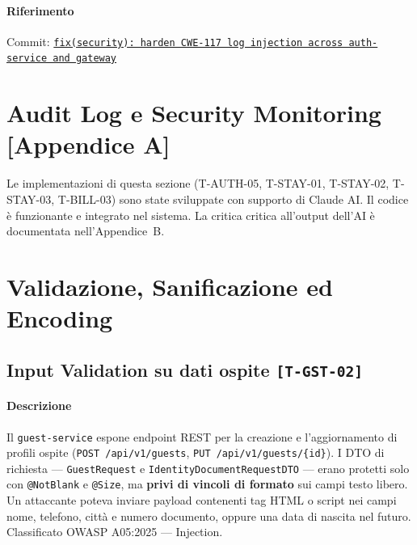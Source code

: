 ﻿\documentclass[a4paper,12pt]{report}
\newcommand{\commitref}[2]{\texttt{\small \href{https://github.com/diegoandruccioli/hotel-pms/commit/#1}{#2}}}
\newcommand{\threat}[1]{\texttt{\small\textcolor{vulnred}{[#1]}}}
\begin{document}
\paragraph{Riferimento} Commit: \commitref{3b62006}{fix(security): harden CWE-117 log injection across auth-service and gateway}

\section{Audit Log e Security Monitoring \textnormal{\small\textcolor{warnyellow}{[Appendice A]}}}

\begin{notebox}[title={Nota metodologica --- Implementazioni AI-assisted}]
Le implementazioni di questa sezione (T-AUTH-05, T-STAY-01, T-STAY-02, T-STAY-03, T-BILL-03) 
sono state sviluppate con supporto di Claude AI. Il codice è funzionante e integrato nel sistema.
La critica critica all'output dell'AI è documentata nell'Appendice~B.
\end{notebox}

\section{Validazione, Sanificazione ed Encoding}

\subsection{Input Validation su dati ospite \threat{T-GST-02}}

\paragraph{Descrizione}
Il \texttt{guest-service} espone endpoint REST per la creazione e l'aggiornamento
di profili ospite (\texttt{POST /api/v1/guests}, \texttt{PUT /api/v1/guests/\{id\}}).
I DTO di richiesta --- \texttt{GuestRequest} e \texttt{IdentityDocumentRequestDTO} ---
erano protetti solo con \texttt{@NotBlank} e \texttt{@Size}, ma \textbf{privi di
vincoli di formato} sui campi testo libero. Un attaccante poteva inviare payload
contenenti tag HTML o script nei campi nome, telefono, città e numero documento,
oppure una data di nascita nel futuro. Classificato OWASP A05:2025 --- Injection.
\end{document}
